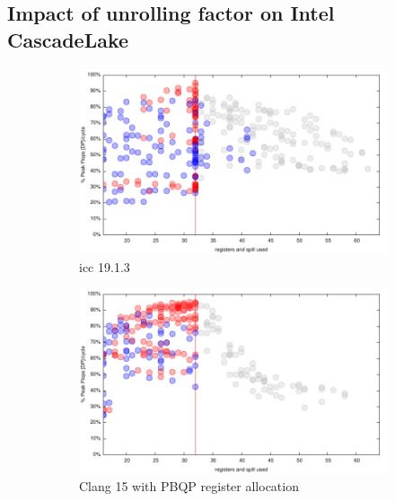 \documentclass{article}
\begin{document}
\subsection{Impact of unrolling factor on Intel CascadeLake}
\begin{figure}[h!]
  \begin{subfigure}[h]{0.45\textwidth}  
\includegraphics[width=\textwidth]{../benches/gemm/cascadelake-64x256x64/icc-19.1.3.pdf}
  \caption{icc 19.1.3}
  \end{subfigure}
  \begin{subfigure}[h]{0.45\textwidth}  
\includegraphics[width=\textwidth]{../benches/gemm/cascadelake-64x256x64/pbqp.pdf}
  \caption{Clang 15 with PBQP register allocation}
  \end{subfigure}
  \begin{subfigure}[h]{0.45\textwidth}  

\end{subfigure}
\end{figure}
\end{document}
